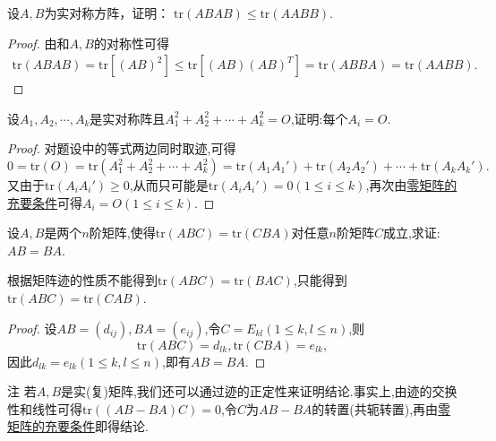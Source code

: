\documentclass[../../main.tex]{subfiles}
\begin{document}
\begin{example}
设$A,B$为实对称方阵，证明：
$\mathrm{tr}\left( ABAB \right) \leqslant \mathrm{tr}\left( AABB \right) .$
\end{example}
\begin{proof}
由和$A,B$的对称性可得
\begin{align*}
\mathrm{tr}\left( ABAB \right) =\mathrm{tr}\left[ \left( AB \right) ^2 \right] \leqslant \mathrm{tr}\left[ \left( AB \right) \left( AB \right) ^T \right] =\mathrm{tr}\left( ABBA \right) =\mathrm{tr}\left( AABB \right) .
\end{align*}

\end{proof}

\begin{example}
设\(A_1,A_2,\cdots,A_k\)是实对称阵且\(A_1^2 + A_2^2+\cdots+A_k^2 = O\),证明:每个\(A_i = O\).
\end{example}
\begin{proof}
对题设中的等式两边同时取迹,可得
\[
0=\mathrm{tr}(O)=\mathrm{tr}(A_1^2 + A_2^2+\cdots+A_k^2)=\mathrm{tr}(A_1A_1')+\mathrm{tr}(A_2A_2')+\cdots+\mathrm{tr}(A_kA_k').
\]
又由于\(\mathrm{tr}(A_iA_i')\geqslant 0\),从而只可能是\(\mathrm{tr}(A_iA_i') = 0(1\leqslant  i\leqslant  k)\),再次由\hyperref[proposition:零矩阵的充要条件]{零矩阵的充要条件}可得\(A_i = O(1\leqslant  i\leqslant  k)\).

\end{proof}

\begin{proposition}\label{proposition:矩阵可交换关于迹的充分条件}
设\(A,B\)是两个\(n\)阶矩阵,使得\(\mathrm{tr}(ABC)=\mathrm{tr}(CBA)\)对任意\(n\)阶矩阵\(C\)成立,求证:\(AB = BA\).
\end{proposition}
\begin{remark}
根据矩阵迹的性质不能得到$\mathrm{tr}(ABC)=\mathrm{tr}(BAC)$,只能得到$\mathrm{tr}(ABC)=\mathrm{tr}(CAB)$.
\end{remark}
\begin{proof}
设\(AB=(d_{ij}),BA=(e_{ij})\),令\(C = E_{kl}(1\leqslant  k,l\leqslant  n)\),则
\[
\mathrm{tr}(ABC)=d_{lk},\mathrm{tr}(CBA)=e_{lk},
\]
因此\(d_{lk}=e_{lk}(1\leqslant  k,l\leqslant  n)\),即有\(AB = BA\).

\end{proof}
\begin{remark}
注 若\(A,B\)是实(复)矩阵,我们还可以通过迹的正定性来证明结论.事实上,由迹的交换性和线性可得\(\mathrm{tr}((AB - BA)C)=0\),令\(C\)为\(AB - BA\)的转置(共轭转置),再由\hyperref[proposition:零矩阵的充要条件]{零矩阵的充要条件}即得结论.
\end{remark}
\end{document}
